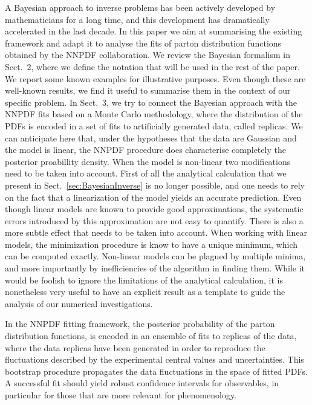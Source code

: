 A Bayesian approach to inverse problems has been actively developed by
mathematicians for a long time, and this development has dramatically
accelerated in the last decade. In this paper we aim at summarising the existing
framework and adapt it to analyse the fits of parton distribution functions
obtained by the NNPDF collaboration. We review the Bayesian formalism in
Sect.~2, where we define the notation that will be used in the rest of the
paper. We report some known examples for illustrative purposes. Even though
these are well-known results, we find it useful to summarise them in the context
of our specific problem. In Sect.~3, we try to connect the Bayesian approach
with the NNPDF fits based on a Monte Carlo methodology, where the distribution
of the PDFs is encoded in a set of fits to artificially generated data, called
replicas. We can anticipate here that, under the hypotheses that the data are
Gaussian and the model is linear, the NNPDF procedure does characterise
completely the posterior proabillity density. When the model is non-linear two
modifications need to be taken into account. First of all the analytical
calculation that we present in Sect.~\ref{sec:BayesianInverse} is no longer
possible, and one needs to rely on the fact that a linearization of the model
yields an accurate prediction. Even though linear models are known to provide
good approximations, the systematic errors introduced by this approximation are
not easy to quantify. There is also a more subtle effect that needs to be taken
into account. When working with linear models, the minimization procedure is
know to have a unique minimum, which can be computed exactly. Non-linear models
can be plagued by multiple minima, and more importantly by inefficiencies of the
algorithm in finding them. While it would be foolish to ignore the limitations
of the analytical calculation, it is nonetheless very useful to have an explicit
result as a template to guide the analysis of our numerical investigations. 

In the NNPDF fitting framework, the posterior probability of the parton
distribution functions, is encoded in an ensemble of fits to replicas of the
data, where the data replicas have been generated in order to reproduce the
fluctuations described by the experimental central values and uncertainties.
This bootstrap procedure propagates the data fluctuations in the space of fitted
PDFs. A successful fit should yield robust confidence intervals for observables,
in particular for those that are more relevant for phenomenology.

